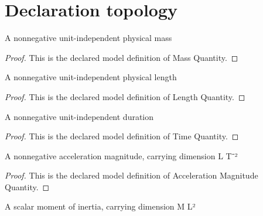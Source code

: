 \section{Declaration topology}
\begin{definition}
  \label{def:physics:phyx-mini-0265:phyxminiproblems-problemphyxmini0265-massquantity}
  A nonnegative unit-independent physical mass
\end{definition}
\begin{proof}
  This is the declared model definition of Mass Quantity.
\end{proof}
\begin{definition}
  \label{def:physics:phyx-mini-0265:phyxminiproblems-problemphyxmini0265-lengthquantity}
  A nonnegative unit-independent physical length
\end{definition}
\begin{proof}
  This is the declared model definition of Length Quantity.
\end{proof}
\begin{definition}
  \label{def:physics:phyx-mini-0265:phyxminiproblems-problemphyxmini0265-timequantity}
  A nonnegative unit-independent duration
\end{definition}
\begin{proof}
  This is the declared model definition of Time Quantity.
\end{proof}
\begin{definition}
  \label{def:physics:phyx-mini-0265:phyxminiproblems-problemphyxmini0265-accelerationmagnitudequantity}
  A nonnegative acceleration magnitude, carrying dimension L T⁻²
\end{definition}
\begin{proof}
  This is the declared model definition of Acceleration Magnitude Quantity.
\end{proof}
\begin{definition}
  \label{def:physics:phyx-mini-0265:phyxminiproblems-problemphyxmini0265-momentofinertiaquantity}
  A scalar moment of inertia, carrying dimension M L²
\end{definition}
